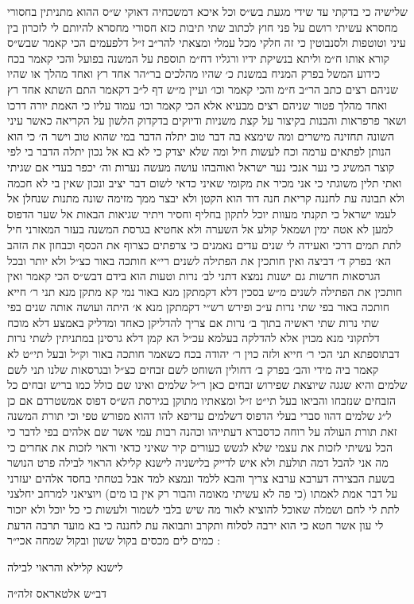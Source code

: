 {שלישיה כי בדקתי עד שידי מגעת בש״ס וכל איכא דמשכחיה דאוקי ש״ס
ההוא מתניתין בחסורי מחסרא עשיתי רושם על פני חוץ לכתוב שתי תיבות
כזא חסורי מחסרא להיותם לי לזכרון בין עיני וטוטפות ולסנבוטין כי זה חלקי
מכל עמלי\hdot
ומצאתי להר״ב ז״ל דלפעמים הכי קאמר שבש״ס קורא אותו ח״מ וליתא
בנשיקת ידיו ורגליו דח״מ תוספת על המשנה בפועל והכי קאמר בכח כידוע המשל
בפרק המניח במשנת כ׳ שהיו מהלכים בר״הר אחד רץ ואחד מהלך או שהיו שניהם
רצים כתב הר״ב ח״מ והכי קאמר וכו׳ ועיין מ״ש דף ל״ב דקאמר התם השתא אחד
רץ ואחד מהלך פטור שניהם רצים מבעיא אלא הכי קאמר וכו׳ עמוד עליו כי האמת
יורה דרכו\hdot
ושאר פרפראות והבנות בקיצור על קצת משניות ודיוקים בדקדוק
הלשון על הקריאה כאשר עיני השונה תחזינה מישרים ומה שימצא בה דבר טוב יתלה
הדבר במי שהוא טוב וישר ה׳ כי הוא הנותן לפתאים ערמה וכח לעשות חיל ומה
שלא יצדק כי לא בא אל נכון יתלה הדבר בי לפי קוצר המשיג כי נער אנכי נער
ישראל ואוהבהו עושה מעשה נערות\hdot
וה׳ יכפר בעדי אם שגיתי ואתי תלין משוגתי
כי אני מכיר את מקומי שאיני כדאי לשום דבר יציב ונכון שאין בי לא חכמה ולא
תבונה עת לחננה\hdot
קריאת חנה דוד הוא הקטן ולא יבצר ממך מזימה שונה מתנות
שנחלן אל לעמו ישראל כי תקנתי מעוות יוכל לתקון בחליף וחסיר ויתיר שגיאות
הבאות אל שער הדפוס למען לא אטה ימין ושמאל קולע אל השערה ולא אחטיא
בגרסת המשנה בעזר המאזרני חיל לתת תמים דרכי ואעידה לי שנים עדים נאמנים
כי צרפתים כצרוף את הכסף וכבחון את הזהב הא׳ בפרק ד׳ דביצה ואין חותכין את
הפתילה לשנים רי״א חותכה באור כצ״ל ולא יותר ובכל הגרסאות חדשות גם ישנות
נמצא דתני לב׳ נרות וטעות הוא בידם דבש״ס הכי קאמר ואין חותכין את הפתילה
לשנים\hdot
מ״ש בסכין דלא דקמתקן מנא באור נמי קא מתקן מנא תני ר׳ חייא חותכה
באור בפי שתי נרות ע״כ\hdot
ופירש רש״י דקמתקן מנא א׳ היתה ועושה אותה שנים\hdot
בפי שתי נרות שתי ראשיה בתוך ב׳ נרות אם צריך להדליקן כאחד ומדליק באמצע
דלא מוכח דלתקוני מנא מכוין אלא להדלקה בעלמא עכ״ל הא קמן דלא גרסינן
במתניתין לשתי נרות דבתוספתא תני הכי ר׳ חייא ולזה כוין ר׳ יהודה בכח כשאמר
חותכה באור וק״ל\hdot
ובעל תי״ט לא קאמר ביה מידי\hdot
והב׳ בפרק ב׳ דחולין השוחט
לשם זבחים כצ״ל ובגרסאות שלנו תני לשם שלמים והיא שגגה שיוצאת שפירוש
זבחים כאן ר״ל שלמים ואינו שם כולל כמו בריש זבחים כל הזבחים שנזבחו והביאו
בעל תי״ט ז״ל ומצאתיו מתוקן בגירסת הש״ס דפוס אמשטרדם\hdot
אם כן ל״ג שלמים
דהוו סברי בעלי הדפוס דשלמים עדיפא להו דהוא מפורש טפי\hdot
וכי תורת המשנה
זאת תורת העולה על רוחה כדסברא דעתייהו וכהנה רבות עמי אשר שם אלהים
בפי לדבר\hdot
כי הכל עשיתי לזכות את עצמי שלא לגשש כעורים קיר שאיני כדאי
וראוי לזכות את אחרים כי מה אני להבל דמה תולעת ולא איש לדייק בלישניה לישנא
קלילא הראוי לבילה פרט הנושר בשעת הבצירה דערבא ערבא צריך והבא ללמד
ונמצא למד אבל בטחתי בחסד אלהים יעזרני על דבר אמת לאמתו (כי פה לא
עשיתי מאומה והבור רק אין בו מים) ויוציאני למרחב יחלצני לתת לי לחם ושמלה
שאוכל להוציא לאור מה שיש בלבי לשמור ולעשות כי כל יוכל\hdot
ולא יזכור לי עון
אשר חטא כי הוא ירבה לסלוח\hdot
ותקרב ותבואה עת לחננה כי בא מועד תרבה
הדעת כמים לים מכסים בקול ששון ובקול שמחה אכי״ר :

}

\vspace{1em}

\setlength{\epigraphwidth}{0.6\textwidth}
\setlength{\epigraphrule}{0pt}

\epigraph{לישנא קלילא והראוי לבילה}{{\larger[2] דב״ש אלטאראס} זלה״ה}
